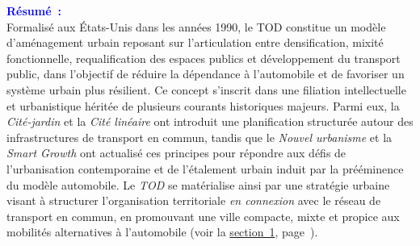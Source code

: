 \begin{refsegment}
    \newpage
    \begin{tcolorbox}[colback=white!5!white,
                      colframe=blue!75!blue,
                      title=
                      \bigskip
                      \center{\textbf{Préambule du chapitre~1}}
                      \\
                      \raggedright{\small{Chapitre composé de \pagedifference{chap1:titre}{chap2:titre} pages, dont \pagedifference{chap1:bibliographie}{chap2:titre} pages de bibliographie}}
                      \bigskip]
\Large{\textbf{\textcolor{blue}{Résumé~:}}}
    \\
    \small{
Formalisé aux États-Unis dans les années 1990, le \acrshort{TOD} constitue un modèle d'aménagement urbain reposant sur l’articulation entre densification, mixité fonctionnelle, requalification des espaces publics et développement du transport public, dans l’objectif de réduire la dépendance à l’automobile et de favoriser un système urbain plus résilient. Ce concept s’inscrit dans une filiation intellectuelle et urbanistique héritée de plusieurs courants historiques majeurs. Parmi eux, la \textsl{Cité-jardin} et la \textsl{Cité linéaire} ont introduit une planification structurée autour des infrastructures de transport en commun, tandis que le \textsl{Nouvel urbanisme} et la \textsl{Smart Growth} ont actualisé ces principes pour répondre aux défis de l’urbanisation contemporaine et de l’étalement urbain induit par la prééminence du modèle automobile. Le \textsl{TOD} se matérialise ainsi par une stratégie urbaine visant à structurer l’organisation territoriale \textsl{en connexion} avec le réseau de transport en commun, en promouvant une ville compacte, mixte et propice aux mobilités alternatives à l’automobile (voir la \hyperref[chap1:tod-presentation-generale]{section~1}, page~\pageref{chap1:tod-presentation-generale}).
    \\
}
\end{tcolorbox}
\end{refsegment}
